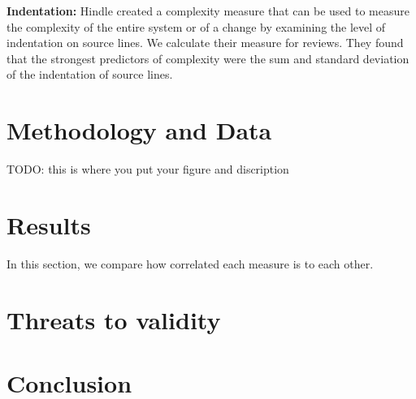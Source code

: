 \documentclass[11pt,twoside,a4paper]{article}
\begin{document}
{\bf Indentation:} Hindle \etal \cite{Hindle2008ICPC} created a complexity
measure that can be used to measure the complexity of the entire system or of a
change by examining the level of indentation on source lines. We calculate
their measure for reviews. They found that the strongest predictors of
complexity were the sum and standard deviation of the indentation of source
lines. 


\section{Methodology and Data}

TODO: this is where you put your figure and discription


\section{Results}

In this section, we compare how correlated each measure is to each other.

\section{Threats to validity}

\section{Conclusion}
\end{document}
